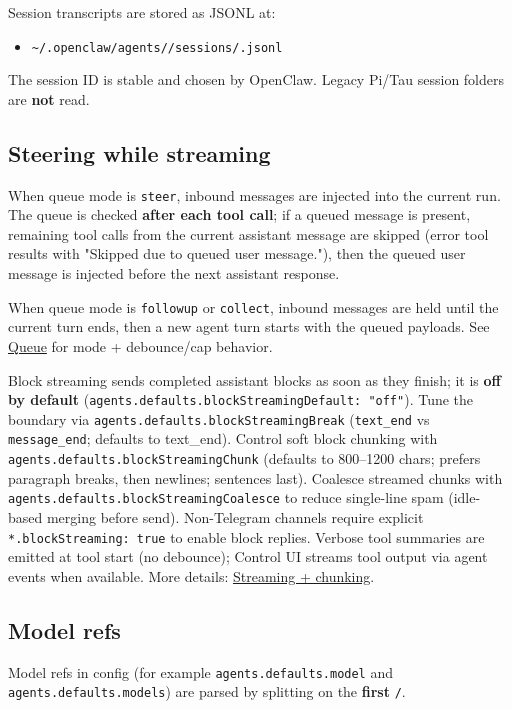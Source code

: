 Session transcripts are stored as JSONL at:

\begin{itemize}
  \item \texttt{\textasciitilde{}/.openclaw/agents//sessions/.jsonl}
\end{itemize}


The session ID is stable and chosen by OpenClaw.
Legacy Pi/Tau session folders are \textbf{not} read.

\subsection{Steering while streaming}


When queue mode is \texttt{steer}, inbound messages are injected into the current run.
The queue is checked \textbf{after each tool call}; if a queued message is present,
remaining tool calls from the current assistant message are skipped (error tool
results with "Skipped due to queued user message."), then the queued user
message is injected before the next assistant response.

When queue mode is \texttt{followup} or \texttt{collect}, inbound messages are held until the
current turn ends, then a new agent turn starts with the queued payloads. See
\href{/concepts/queue}{Queue} for mode + debounce/cap behavior.

Block streaming sends completed assistant blocks as soon as they finish; it is
\textbf{off by default} (\texttt{agents.defaults.blockStreamingDefault: "off"}).
Tune the boundary via \texttt{agents.defaults.blockStreamingBreak} (\texttt{text\_end} vs \texttt{message\_end}; defaults to text\_end).
Control soft block chunking with \texttt{agents.defaults.blockStreamingChunk} (defaults to
800–1200 chars; prefers paragraph breaks, then newlines; sentences last).
Coalesce streamed chunks with \texttt{agents.defaults.blockStreamingCoalesce} to reduce
single-line spam (idle-based merging before send). Non-Telegram channels require
explicit \texttt{*.blockStreaming: true} to enable block replies.
Verbose tool summaries are emitted at tool start (no debounce); Control UI
streams tool output via agent events when available.
More details: \href{/concepts/streaming}{Streaming + chunking}.

\subsection{Model refs}


Model refs in config (for example \texttt{agents.defaults.model} and \texttt{agents.defaults.models}) are parsed by splitting on the \textbf{first} \texttt{/}.

